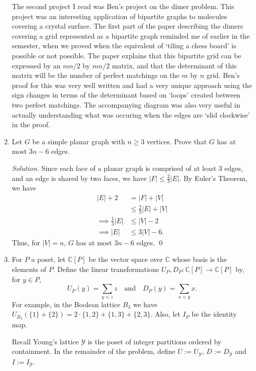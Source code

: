 \documentclass[11pt,letterpaper,dvipsnames]{article}
\newenvironment{solution}{\color{BlueViolet}\textit{Solution.}}{\color{black}}
\begin{document}
\begin{enumerate}
	\hspace{1cm}
	The second project I read was Ben's project on the dimer problem. This project was an interesting application of bipartite graphs to molecules covering a crystal surface. The first part of the paper describing the dimers covering a grid represented as a bipartite graph reminded me of earlier in the semester, when we proved when the equivalent of `tiling a chess board' is possible or not possible. The paper explains that this bipartite grid can be expressed by an $mn/2$ by $mn/2$ matrix, and that the determinant of this matrix will be the number of perfect matchings on the $m$ by $n$ grid. Ben's proof for this was very well written and had a very unique approach using the sign changes in terms of the determinant based on `loops' created between two perfect matchings. The accompanying diagram was also very useful in actually understanding what was occuring when the edges are `slid clockwise' in the proof.
	
	\color{black}
	
	
	\item Let $G$ be a simple planar graph with $n \geq 3$ vertices.
	Prove that $G$ has at most $3n-6$ edges.
	
	\begin{solution}
		Since each face of a planar graph is comprised of at least 3 edges, and an edge is shared by two faces, we have $|F|\leq \frac{2}{3}|E|$. By Euler's Theorem, we have
		\begin{align*}
			|E|+2 &= |F|+|V| \\
			&\leq{} \frac{2}{3}|E|+|V| \\
			\implies \frac{1}{3}|E| &\leq |V|-2 \\
			\implies |E| &\leq 3|V|-6.
		\end{align*}
		Thus, for $|V|=n$, $G$ has at most $3n-6$ edges. \qed
	\end{solution}
	
	
	\item For $P$ a poset, let $\mathbb{C}[P]$ be the vector space over $\mathbb{C}$ whose basis is the elements of $P$.
	Define the linear transformations $U_P,D_P: \mathbb{C}[P] \to \mathbb{C}[P]$ by, for $y \in P$,
	\[
	U_P(y) = \sum_{y \lessdot z} z \quad \mbox{and} \quad D_P(y) = \sum_{x \lessdot y} x.
	\]
	For example, in the Boolean lattice $B_3$ we have $U_{B_3}(\{1\} + \{2\}) = 2 \cdot \{1,2\} + \{1,3\} + \{2,3\}$.
	Also, let $I_P$ be the identity map.
	
	Recall Young's lattice $\mathcal{Y}$ is the poset of integer partitions ordered by containment.
	In the remainder of the problem, define $U := U_\mathcal{Y}$, $D:= D_\mathcal{Y}$ and $I:= I_\mathcal{Y}$.
	

\end{enumerate}
\end{document}
